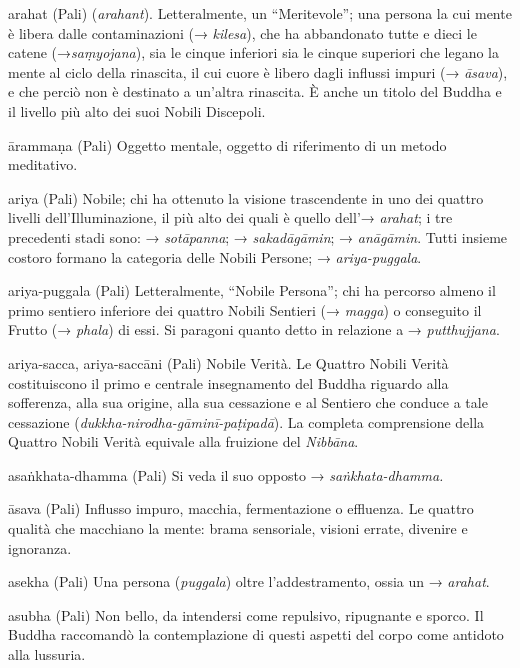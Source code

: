 \begin{glossarydescription}
\item[arahat] (Pali) (\emph{arahant}). Letteralmente, un ``Meritevole''; una
persona la cui mente è libera dalle contaminazioni (→ \emph{kilesa}),
che ha abbandonato tutte e dieci le catene (→\emph{saṃyojana}), sia le
cinque inferiori sia le cinque superiori che legano la mente al ciclo
della rinascita, il cui cuore è libero dagli influssi impuri (→
\emph{āsava}), e che perciò non è destinato a un'altra rinascita. È
anche un titolo del Buddha e il livello più alto dei suoi Nobili
Discepoli.

\item[ārammaṇa] (Pali) Oggetto mentale, oggetto di riferimento di un metodo
meditativo.

\item[ariya] (Pali) Nobile; chi ha ottenuto la visione trascendente in uno dei
quattro livelli dell'Illuminazione, il più alto dei quali è quello
dell'→ \emph{arahat}; i tre precedenti stadi sono: → \emph{sotāpanna}; →
\emph{sakadāgāmin}; → \emph{anāgāmin}. Tutti insieme costoro formano la
categoria delle Nobili Persone; → \emph{ariya-puggala}.

\item[ariya-puggala] (Pali) Letteralmente, ``Nobile Persona''; chi ha percorso
almeno il primo sentiero inferiore dei quattro Nobili Sentieri (→
\emph{magga}) o conseguito il Frutto (→ \emph{phala}) di essi. Si
paragoni quanto detto in relazione a → \emph{putthujjana}.

\item[ariya-sacca, ariya-saccāni] (Pali) Nobile Verità. Le Quattro
Nobili Verità costituiscono il primo e centrale insegnamento del Buddha
riguardo alla sofferenza, alla sua origine, alla sua cessazione e al
Sentiero che conduce a tale cessazione
(\emph{dukkha-nirodha-gāminī-paṭipadā}). La completa comprensione della
Quattro Nobili Verità equivale alla fruizione del \emph{Nibbāna}.

\item[asaṅkhata-dhamma] (Pali) Si veda il suo opposto →
\emph{saṅkhata-dhamma.}

\item[āsava] (Pali) Influsso impuro, macchia, fermentazione o effluenza. Le
quattro qualità che macchiano la mente: brama sensoriale, visioni
errate, divenire e ignoranza.

\item[asekha] (Pali) Una persona (\emph{puggala}) oltre l'addestramento, ossia
un → \emph{arahat}.

\item[asubha] (Pali) Non bello, da intendersi come repulsivo, ripugnante e
sporco. Il Buddha raccomandò la contemplazione di questi aspetti del
corpo come antidoto alla lussuria.


\end{glossarydescription}
